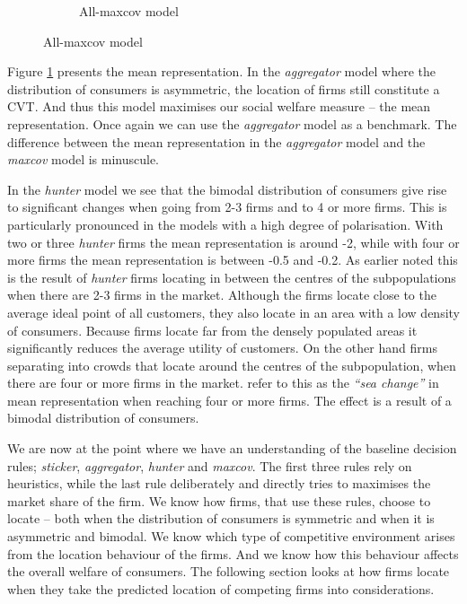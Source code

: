 \documentclass[preprint, 12pt]{elsarticle}
\begin{document}
\begin{figure}[ht!]
\begin{subfigure}[t]{0.315\textwidth}
		\caption{All-maxcov model}
		\label{fig:representation_maxcov}
	\end{subfigure}
	
	\label{fig:asymetric_representation}
\end{figure}

Figure \ref{fig:representation_maxcov} presents the mean representation. In the \emph{aggregator} model where the distribution of consumers is asymmetric, the location of firms still constitute a CVT. And thus this model maximises our social welfare measure -- the mean representation. Once again we can use the \emph{aggregator} model as a benchmark. The difference between the mean representation in the \emph{aggregator} model and the \emph{maxcov} model is minuscule.

In the \emph{hunter} model we see that the bimodal distribution of consumers give rise to significant changes when going from 2-3 firms and to 4 or more firms. This is particularly pronounced in the models with a high degree of polarisation. With two or three \emph{hunter} firms the mean representation is around -2, while with four or more firms the mean representation is between -0.5 and -0.2. As earlier noted this is the result of \emph{hunter} firms locating in between the centres of the subpopulations when there are 2-3 firms in the market. Although the firms locate close to the average ideal point of all customers, they also locate in an area with a low density of consumers. Because firms locate far from the densely populated areas it significantly reduces the average utility of customers. On the other hand firms separating into crowds that locate around the centres of the subpopulation, when there are four or more firms in the market. \citet[chapter~5, p.~102]{Laver_Sergenti_2011} refer to this as the \emph{``sea change''} in mean representation when reaching four or more firms. The effect is a result of a bimodal distribution of consumers.

We are now at the point where we have an understanding of the baseline decision rules; \emph{sticker}, \emph{aggregator}, \emph{hunter} and \emph{maxcov}. The first three rules rely on heuristics, while the last rule deliberately and directly tries to maximises the market share of the firm. We know how firms, that use these rules, choose to locate -- both when the distribution of consumers is symmetric and when it is asymmetric and bimodal. We know which type of competitive environment arises from the location behaviour of the firms. And we know how this behaviour affects the overall welfare of consumers. The following section looks at how firms locate when they take the predicted location of competing firms into considerations.
\end{document}

